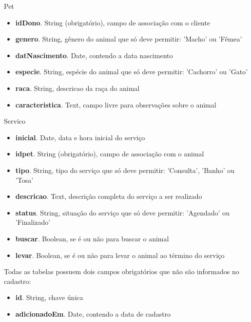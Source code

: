 \documentclass[a4paper,11pt]{article}
\begin{document}
{\ttfamily Pet}
\begin{itemize}
  \item \textbf{idDono}. String (obrigatório), campo de associação com o cliente
  \item \textbf{genero}. String, gênero do animal que só deve permitir: 'Macho' ou 'Fêmea'
  \item \textbf{datNascimento}. Date, contendo a data nascimento
  \item \textbf{especie}. String, espécie do animal que só deve permitir: 'Cachorro' ou 'Gato'
  \item \textbf{raca}. String, descricao da raça do animal
  \item \textbf{caracteristica}. Text, campo livre para observações sobre o animal
\end{itemize}
{\ttfamily Servico}
\begin{itemize}
  \item \textbf{inicial}. Date, data e hora inicial do serviço
  \item \textbf{idpet}. String (obrigatório), campo de associação com o animal
  \item \textbf{tipo}. String, tipo do serviço que só deve permitir: 'Consulta', 'Banho' ou 'Tosa'
  \item \textbf{descricao}. Text, descrição completa do serviço a ser realizado
  \item \textbf{status}. String, situação do serviço que só deve permitir: 'Agendado' ou 'Finalizado'
  \item \textbf{buscar}. Boolean, se é ou não para buscar o animal
  \item \textbf{levar}. Boolean, se é ou não para levar o animal ao término do serviço
\end{itemize}
Todas as tabelas possuem dois campos obrigatórios que não são informados no cadastro:
\begin{itemize}
  \item \textbf{id}. String, chave única
  \item \textbf{adicionadoEm}. Date, contendo a data de cadastro
\end{itemize}
\end{document}
